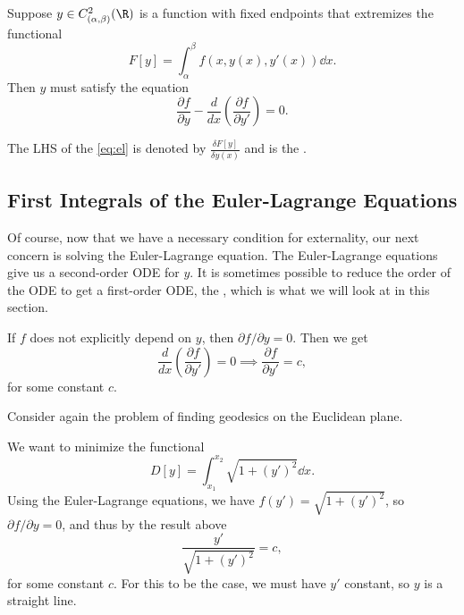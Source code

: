 \documentclass[a4paper]{scrartcl}
\begin{document}
\begin{theorem}
	Suppose $y \in C^2_{(\alpha, \beta)}(\R)$ is a function with fixed endpoints that extremizes the functional
	$$
	F[y] = \int_{\alpha}^{\beta} f(x, y(x), y'(x)) \dd x.
	$$
	Then $y$ must satisfy the  equation
	\begin{equation}\label{eq:el}
		\frac{\partial f}{\partial y} - \frac{d}{dx} \left(\frac{\partial f}{\partial y'}\right) = 0. \tag{$\dagger$}
	\end{equation}
\end{theorem}

\begin{notation}
	The LHS of the \eqref{eq:el} is denoted by $\displaystyle\frac{\delta F[y]}{\delta y(x)}$ and is the .
\end{notation}

\subsection{First Integrals of the Euler-Lagrange Equations}

Of course, now that we have a necessary condition for externality, our next concern is solving the Euler-Lagrange equation.
The Euler-Lagrange equations give us a second-order ODE for $y$.
It is sometimes possible to reduce the order of the ODE to get a first-order ODE, the , which is what we will look at in this section.

If $f$ does not explicitly depend on $y$, then $\partial f/\partial y = 0$. Then we get
$$
 \frac{d}{dx} \left(\frac{\partial f}{\partial y'}\right) = 0 \implies \frac{\partial f}{\partial y'} = c,
$$
for some constant $c$.

\begin{example}
	Consider again the problem of finding geodesics on the Euclidean plane. 

	We want to minimize the functional
	$$
	D[y] = \int_{x_1}^{x_2} \sqrt{1 + (y')^2} \dd x.
	$$
	Using the Euler-Lagrange equations, we have $f(y') = \sqrt{1 + (y')^2}$, so $\partial f/\partial y = 0$, and thus by the result above
	$$
	\frac{y'}{\sqrt{1 + (y')^2}} = c,
	$$
	for some constant $c$. For this to be the case, we must have $y'$ constant, so $y$ is a straight line.
\end{example}
\end{document}
